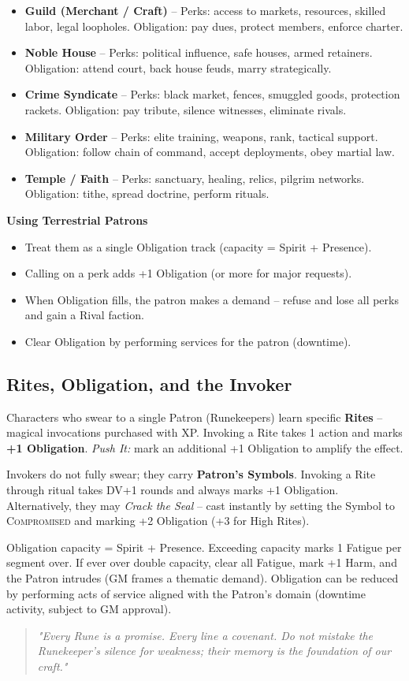 \begin{itemize}
  \item \textbf{Guild (Merchant / Craft)} -- Perks: access to markets, resources, skilled labor, legal loopholes. Obligation: pay dues, protect members, enforce charter.
  \item \textbf{Noble House} -- Perks: political influence, safe houses, armed retainers. Obligation: attend court, back house feuds, marry strategically.
  \item \textbf{Crime Syndicate} -- Perks: black market, fences, smuggled goods, protection rackets. Obligation: pay tribute, silence witnesses, eliminate rivals.
  \item \textbf{Military Order} -- Perks: elite training, weapons, rank, tactical support. Obligation: follow chain of command, accept deployments, obey martial law.
  \item \textbf{Temple / Faith} -- Perks: sanctuary, healing, relics, pilgrim networks. Obligation: tithe, spread doctrine, perform rituals.
\end{itemize}

\textbf{Using Terrestrial Patrons}
\begin{itemize}
  \item Treat them as a single Obligation track (capacity = Spirit + Presence).
  \item Calling on a perk adds +1 Obligation (or more for major requests).
  \item When Obligation fills, the patron makes a demand -- refuse and lose all perks and gain a Rival faction.
  \item Clear Obligation by performing services for the patron (downtime).
\end{itemize}

\subsection{Rites, Obligation, and the Invoker}
Characters who swear to a single Patron (Runekeepers) learn specific \textbf{Rites} -- magical invocations purchased with XP. Invoking a Rite takes 1 action and marks \textbf{+1 Obligation}. \emph{Push It:} mark an additional +1 Obligation to amplify the effect.

Invokers do not fully swear; they carry \textbf{Patron's Symbols}. Invoking a Rite through ritual takes DV+1 rounds and always marks +1 Obligation. Alternatively, they may \emph{Crack the Seal} -- cast instantly by setting the Symbol to \textsc{Compromised} and marking +2 Obligation (+3 for High Rites).

Obligation capacity = Spirit + Presence. Exceeding capacity marks 1 Fatigue per segment over. If ever over double capacity, clear all Fatigue, mark +1 Harm, and the Patron intrudes (GM frames a thematic demand). Obligation can be reduced by performing acts of service aligned with the Patron's domain (downtime activity, subject to GM approval).

\begin{quote}
\emph{"Every Rune is a promise. Every line a covenant. Do not mistake the Runekeeper's silence for weakness; their memory is the foundation of our craft."}
\end{quote}
